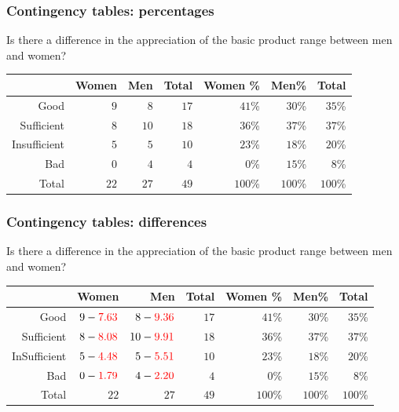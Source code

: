\documentclass{beamer}
\begin{document}
\begin{frame}
  \frametitle{Contingency tables: percentages}
  Is there a difference in the appreciation of the basic product range between men and women?
  \begin{adjustwidth}{-1.5em}{-1.5em}
    \begin{table}[h] \centering
      \begin{tabular}{@{}rrrrrrr@{}}
        \toprule
                     & Women &  Men & Total & Women \% &   Men\% &   Total \\ \midrule
                Good &   $9$ &  $8$ &  $17$ &   $41$\% &  $30$\% &  $35$\% \\
          Sufficient &   $8$ & $10$ &  $18$ &   $36$\% &  $37$\% &  $37$\% \\
        Insufficient &   $5$ &  $5$ &  $10$ &   $23$\% &  $18$\% &  $20$\% \\
                 Bad &   $0$ &  $4$ &   $4$ &    $0$\% &  $15$\% &   $8$\% \\
               Total &  $22$ & $27$ &  $49$ &  $100$\% & $100$\% & $100$\% \\ \bottomrule
      \end{tabular}
    \end{table}
  \end{adjustwidth}
\end{frame}

\begin{frame}
  \frametitle{Contingency tables: differences}
  Is there a difference in the appreciation of the basic product range between men and women?
  \begin{adjustwidth}{-1.5em}{-1.5em}
    \begin{table}[h] \centering
      \begin{tabular}{@{}rrrrrrr@{}}
        \toprule
                     &                       Women &                          Men & Total & Women \% &   Men\% &   Total \\ \midrule
                Good &  $9 -\textcolor{red}{7.63}$ &  $8 - \textcolor{red}{9.36}$ &  $17$ &   $41$\% &  $30$\% &  $35$\% \\
          Sufficient & $8 - \textcolor{red}{8.08}$ & $10 - \textcolor{red}{9.91}$ &  $18$ &   $36$\% &  $37$\% &  $37$\% \\
        InSufficient & $5 - \textcolor{red}{4.48}$ &  $5 - \textcolor{red}{5.51}$ &  $10$ &   $23$\% &  $18$\% &  $20$\% \\
                 Bad & $0 - \textcolor{red}{1.79}$ &  $4 - \textcolor{red}{2.20}$ &   $4$ &    $0$\% &  $15$\% &   $8$\% \\
               Total &                        $22$ &                         $27$ &  $49$ &  $100$\% & $100$\% & $100$\% \\ \bottomrule
      \end{tabular}
    \end{table}
  \end{adjustwidth}
\end{frame}
\end{document}
